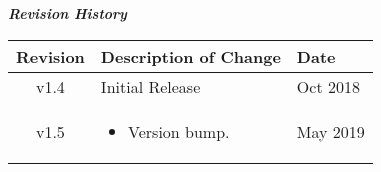 \begin{center}
	\textit{\textbf{Revision History}}
		\begin{table}[H]
		\label{table:revisions} %
			\begin{tabularx}{\textwidth}{|c|X|l|}
			\hline
			\rowcolor{blue}
			\textbf{Revision} & \textbf{Description of Change} & \textbf{Date} \\
		    \hline
		    v1.4 & Initial Release & Oct 2018 \\
		    \hline
        v1.5 & \begin{itemize} \item Version bump.  \end{itemize} & May 2019 \\
		    \hline
			\end{tabularx}
		\end{table}
	\end{center}	
	
